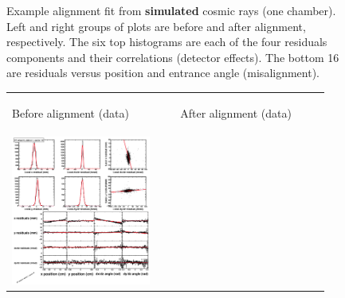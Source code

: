 \begin{figure}[p]
\begin{tabular}{p{0.47\linewidth} c p{0.47\linewidth}}
\end{tabular}
\caption{Example alignment fit from {\bf simulated} cosmic rays (one chamber).  Left and right groups of plots are before and after alignment, respectively.  The six top histograms are each of the four residuals components and their correlations (detector effects).  The bottom 16 are residuals versus position and entrance angle (misalignment). \label{exampleData_wh0st1sec10_MC}}
\end{figure}

\begin{figure}[p]
\centering
\begin{tabular}{p{0.47\linewidth} c p{0.47\linewidth}}
\begin{center}Before alignment (data)\end{center} & & \begin{center}After alignment (data)\end{center} \\
\includegraphics[width=\linewidth]{exampleData_wh0st1sec10_before.eps} & &

\end{tabular}
\end{figure}

